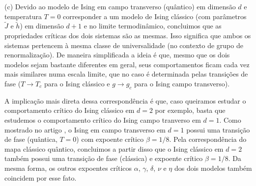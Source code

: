 \documentclass[a4paper,10pt]{article}
\begin{document}
(c) Devido ao modelo de Ising em campo transverso (quântico) em dimensão $d$ e temperatura $T = 0$ corresponder a um modelo de Ising clássico (com parâmetros $\tilde{J}$ e $\tilde{h}$) em dimensão $d+1$ e no limite termodinâmico, concluimos que as propriedades críticas dos dois sistemas são as mesmas. Isso significa que ambos os sistemas pertencem à mesma classe de universalidade (no contexto de grupo de renormalização). De maneira simplificada a ideia é que, mesmo que os dois modelos sejam bastante diferentes em geral, seus comportamentos ficam cada vez mais similares numa escala limite, que no caso é determinada pelas transições de fase ($T \to T_c$ para o Ising clássico e $g \to g_c$ para o Ising campo transverso).

\n

A implicação mais direta dessa correspondência é que, caso queiramos estudar o comportamento crítico do Ising clássico em $d=2$ por exemplo, basta que estudemos o comportamento crítico do Ising campo tranverso em $d = 1$. Como mostrado no artigo \cite{pfeuty}, o Ising em campo transverso em $d=1$ possui uma transição de fase (quântica, $T=0$) com expoente crítico $\beta = 1/8$. Pela correspondência do mapa clássico quântico, concluimos a partir disso que o Ising clássico em $d=2$ também possui uma transição de fase (clássica) e expoente crítico $\beta = 1/8$. Da mesma forma, os outros expoentes críticos $\alpha$, $\gamma$, $\delta$, $\nu$ e $\eta$ dos dois modelos também coincidem por esse fato.


%


\end{document}
